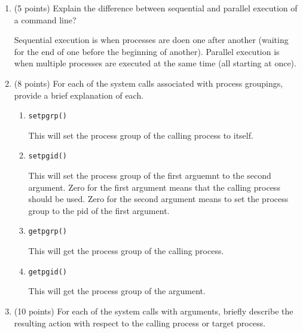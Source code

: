 \documentclass{article}[9pt]
\newenvironment{answerfont}{\fontfamily{qhv}\selectfont}{\par}
\newenvironment{myanswer}{\begin{mdframed}\begin{answerfont}}{\end{answerfont}\end{mdframed}}
\begin{document}
\begin{enumerate}
\item (5 points) Explain the difference between sequential and parallel execution
of a command line?

  \begin{myanswer}
    Sequential execution is when processes are doen one after another
    (waiting for the end of one before the beginning of another).
    Parallel execution is when multiple processes are executed at the
    same time (all starting at once).
  \end{myanswer}

\item (8 points) For each of the system calls associated with process groupings,
provide a brief explanation of each.

\begin{enumerate}
\item \texttt{setpgrp()}

  \begin{myanswer}
    This will set the process group of the calling process to itself.
  \end{myanswer}

\item \texttt{setpgid()}

  \begin{myanswer}
    This will set the process group of the first arguemnt to the second
    argument.  Zero for the first argument means that the calling
    process should be used.  Zero for the second argument means to set
    the process group to the pid of the first argument.
  \end{myanswer}

\item \texttt{getpgrp()}

  \begin{myanswer}
    This will get the process group of the calling process.
  \end{myanswer}

\item \texttt{getpgid()}

  \begin{myanswer}
    This will get the process group of the argument.
  \end{myanswer}

\end{enumerate}

\item (10 points) For each of the system calls with arguments, briefly describe the
resulting action with respect to the calling process or target
process.


\end{enumerate}
\end{document}

